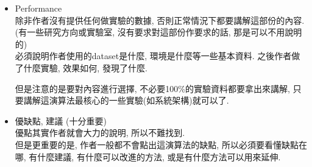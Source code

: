 \begin{enumerate}
{\begin{itemize}
{\begin{enumerate}
          \item
          {
            Lemma\\
            是Theorem分開用來簡單說明的一個東西
          } %

          \item
          {
            Theorem\\
            是Lemma集合出的一個理論
          } %

          \item
          {
            Corollary\\
            在Theorem的結果用另一種條件或什麼得出的另一結果
          } %

          \item
          {
            Proposition\\
            以上的看情況來決定要不要講, 如果是跟algorithm無關的, 則不用講, 否則要講一點點.\\

            如果不講定理, 都能講懂algorithm, 那則不用講.\\
            而如果algorithm會使用到一個小小的定理, 即只要講定理的結果.
          } %

          \item
          {
            Proof\\
            在報告時是絕對不用講的
          } %
        \end{enumerate}
      } %

      \item
      {
        Performance\\
        除非作者沒有提供任何做實驗的數據, 否則正常情況下都要講解這部份的內容.
        (有一些研究方向或實驗室, 沒有要求對這部份作要求的話, 那是可以不用說明的)\\
        必須說明作者使用的dataset是什麼, 環境是什麼等一些基本資料. 之後作者做了什麼實驗, 效果如何, 發現了什麼.

        但是注意的是要對內容進行選擇, 不必要100\%的實驗資料都要拿出來講解, 只要講解這演算法最核心的一些實驗(如系統架構)就可以了.
      } %

      \item
      {
        優缺點, 建議 (十分重要)\\
        優點其實作者就會大力的說明, 所以不難找到.\\
        但是更重要的是, 作者一般都不會點出這演算法的缺點, 所以必須要看懂缺點在哪, 有什麼建議, 有什麼可以改進的方法, 或是有什麼方法可以用來延伸.
      } %


\end{itemize}}
\end{enumerate}

